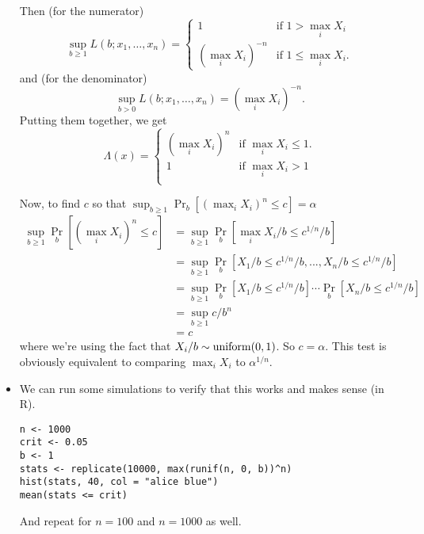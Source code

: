 \begin{itemize}[leftmargin=0pt]
\begin{ex}
    Then (for the numerator)
    \begin{equation*}
      \sup_{b \geq 1} L(b; x_1,\dots,x_n) =
      \begin{cases}
        1 & \text{if } 1 > \max_i X_i \\
        (\max_i X_i)^{-n} & \text{if } 1 \leq \max_i X_i.
      \end{cases}
    \end{equation*}
    and (for the denominator)
    \begin{equation*}
      \sup_{b > 0} L(b; x_1,\dots,x_n) = (\max_i X_i)^{-n}.
    \end{equation*}
    Putting them together, we get
    \begin{equation*}
      \Lambda(x) =
      \begin{cases}
        (\max_i X_i)^n & \text{if } \max_i X_i \leq 1. \\
        1 & \text{if } \max_i X_i > 1 \\
      \end{cases}
    \end{equation*}

    Now, to find $c$ so that $\sup_{b \geq 1} \Pr_b[(\max_i X_i)^n \leq c] = \alpha$
    \begin{align*}
      \sup_{b \geq 1} \Pr_b[(\max_i X_i)^n \leq c]
      &= \sup_{b\geq 1} \Pr_b[\max_i X_i/b \leq c^{1/n}/b] \\
      &= \sup_{b \geq 1} \Pr_b[X_1/b \leq c^{1/n}/b, ..., X_n/b \leq c^{1/n}/b] \\
      &= \sup_{b \geq 1} \Pr_b[X_1/b \leq c^{1/n}/b] \cdots \Pr_b[X_n/b \leq c^{1/n}/b] \\
      &= \sup_{b \geq 1} c/b^n \\
      &= c
    \end{align*}
    where we're using the fact that $X_i/b \sim \operatorname{uniform}(0,1)$.  So
    $c=\alpha$.  This test is obviously equivalent to comparing $\max_i
    X_i$ to $\alpha^{1/n}$.
  \end{ex}

\item We can run some simulations to verify that this works and makes
  sense (in R).
\begin{verbatim}
n <- 1000
crit <- 0.05
b <- 1
stats <- replicate(10000, max(runif(n, 0, b))^n)
hist(stats, 40, col = "alice blue")
mean(stats <= crit)
\end{verbatim}
  And repeat for $n = 100$ and $n = 1000$ as well.
\end{itemize}


